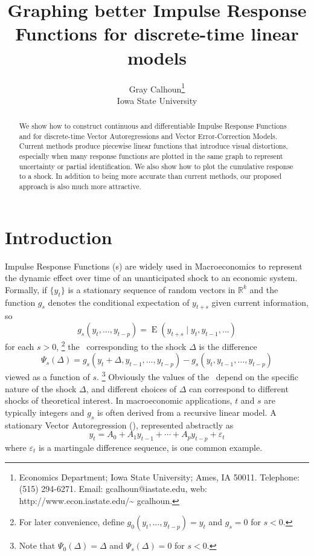 \documentclass[12pt,fleqn]{article}
\date{\VERSION}
\author{Gray Calhoun\thanks{Economics Department; Iowa State
    University; Ames, IA 50011. Telephone: (515) 294-6271.  Email:
    \guillemotleft gcalhoun@iastate.edu\guillemotright, web:
    \guillemotleft http://www.econ.iastate.edu/\textasciitilde
    gcalhoun\guillemotright.} \\
  Iowa State University}
\title{Graphing better Impulse Response Functions for discrete-time
  linear models}
\DeclareMathOperator{\E}{E}
\newcommand{\vep}{\varepsilon}
\newcommand{\RR}{\mathbb{R}}
\begin{document}
\maketitle
\begin{abstract}\noindent%
  We show how to construct continuous and differentiable
  Impulse Response Functions and for discrete-time Vector Autoregressions
  and Vector Error-Correction Models. Current methods produce piecewise linear
  functions that introduce visual distortions, especially when many
  response functions are plotted in the same graph to represent
  uncertainty or partial identification. We also show how to plot the
  cumulative response to a shock. In addition to being more accurate
  than current methods, our proposed approach is also much more attractive.
\end{abstract}

\tableofcontents
\newpage

\section{Introduction}

Impulse Response Functions (\IRF s) are widely used in Macroeconomics
to represent the dynamic effect over time of an unanticipated shock to
an economic system. Formally, if $\{y_t\}$ is a stationary sequence of
random vectors in $\RR^k$ and the function $g_s$ denotes the conditional
expectation of $y_{t+s}$ given current information, so
\[
g_s(y_t,\dots,y_{t-p}) = \E(y_{t+s} \mid y_t, y_{t-1},\dots)
\]
for each $s > 0$,%
\footnote{For later convenience, define
  $g_0(y_t,\dots,y_{t-p}) = y_t$ and $g_s = 0$ for $s < 0$.} %
the \IRF\ corresponding to the shock $\Delta$ is the difference
\[
\Psi_s(\Delta) = g_s(y_t + \Delta, y_{t-1},\dots,y_{t-p}) - g_s(y_t, y_{t-1},\dots,y_{t-p})
\]
viewed as a function of $s$.%
\footnote{Note that $\Psi_0(\Delta) = \Delta$ and $\Psi_s(\Delta) = 0$ for $s <
  0$.} %
Obviously the values of the \IRF\ depend on the specific nature of the
shock $\Delta$, and different choices of $\Delta$ can correspond to
different shocks of theoretical interest.  In macroeconomic
applications, $t$ and $s$ are typically integers and $g_s$ is often
derived from a recursive linear model. A stationary Vector Autoregression
(\VAR), represented abstractly as
\begin{equation}\label{eq:1}
  y_t = A_0 + A_1 y_{t-1} + \cdots + A_p y_{t-p} + \vep_t
\end{equation}
where $\vep_t$ is a martingale difference sequence, is one common example.
\end{document}
